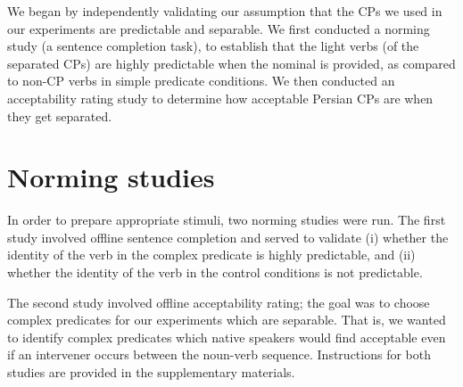 \documentclass{frontiersSCNS}\usepackage{knitr} %
\begin{document}
We began by independently validating our assumption that the CPs we used in our experiments are predictable and separable.
We first conducted a norming study  (a sentence completion task), to establish that the light verbs (of the separated CPs) are highly predictable when the nominal is provided, as compared to non-CP verbs in simple predicate conditions. 
We then conducted an acceptability rating study to determine  how acceptable Persian CPs are when they get separated.  

\section{Norming studies}\label{normingstudies}

In order to prepare appropriate stimuli, two norming studies were run. 
The first study involved offline sentence completion and served to validate (i) whether the identity of the verb in the complex predicate is highly predictable, and (ii) whether the identity of the verb in the control conditions is not predictable.

The second study involved offline acceptability rating; the goal was to choose  complex predicates for our experiments which are separable. That is, we wanted to identify complex predicates which native speakers would find acceptable even if an intervener occurs between the noun-verb sequence.
Instructions for both studies are provided in the supplementary materials.
\end{document}
